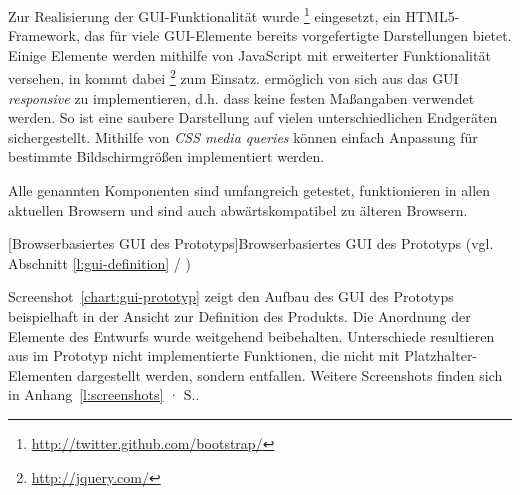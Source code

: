 Zur Realisierung der GUI-Funktionalität wurde \footnote{\url{http://twitter.github.com/bootstrap/}} eingesetzt, ein HTML5-Framework, das für viele GUI-Elemente bereits vorgefertigte Darstellungen bietet. Einige Elemente werden mithilfe von JavaScript mit erweiterter Funktionalität versehen, in  kommt dabei \footnote{\url{http://jquery.com/}} zum Einsatz.  ermöglich von sich aus das GUI \emph{responsive} zu implementieren, d.h. dass keine festen Maßangaben verwendet werden. So ist eine saubere Darstellung auf vielen unterschiedlichen Endgeräten sichergestellt. Mithilfe von \emph{CSS media queries} können einfach Anpassung für bestimmte Bildschirmgrößen implementiert werden.

Alle genannten Komponenten sind umfangreich getestet, funktionieren in allen aktuellen Browsern und sind auch abwärtskompatibel zu älteren Browsern.

\setlength\fboxsep{2pt}
\setlength\fboxrule{0.5pt}

\begin{center}
[Browserbasiertes GUI des Prototyps]{Browserbasiertes GUI des Prototyps (vgl. Abschnitt \ref{l:gui-definition} / \pageref{l:gui-definition})}\label{chart:gui-prototyp}
\end{center}

Screenshot~\ref{chart:gui-prototyp} zeigt den Aufbau des GUI des Prototyps beispielhaft in der Ansicht zur Definition des Produkts. Die Anordnung der Elemente des Entwurfs wurde weitgehend beibehalten. Unterschiede resultieren aus im Prototyp nicht implementierte Funktionen, die nicht mit Platzhalter-Elementen dargestellt werden, sondern entfallen. Weitere Screenshots finden sich in Anhang~\ref{l:screenshots} · S.\pageref{l:screenshots}.

